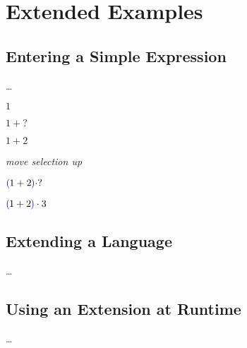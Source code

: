 \section{Extended Examples}

\subsection{Entering a Simple Expression}
\dots

$1$

$1+?$

$1+2$

\emph{move selection up}

${\color{blue}\left(\!\right.} 1+2 {\color{blue}\left.\!\right)}\cdot?$

${\color{blue}\left(\!\right.} 1+2 {\color{blue}\left.\!\right)}\cdot3$ 


\subsection{Extending a Language}
\dots



\subsection{Using an Extension at Runtime}
\dots

